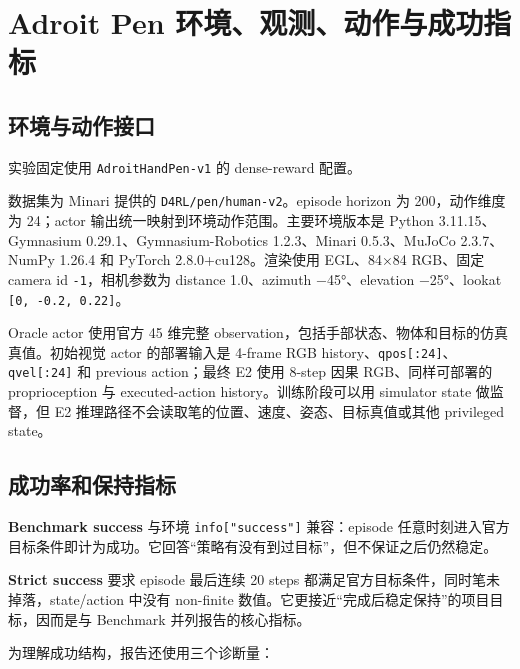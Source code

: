 \hypertarget{adroit-pen-ux73afux5883ux89c2ux6d4bux52a8ux4f5cux4e0eux6210ux529fux6307ux6807}{%
\section{Adroit Pen 环境、观测、动作与成功指标}\label{adroit-pen-ux73afux5883ux89c2ux6d4bux52a8ux4f5cux4e0eux6210ux529fux6307ux6807}}

\hypertarget{ux73afux5883ux4e0eux52a8ux4f5cux63a5ux53e3}{%
\subsection{环境与动作接口}\label{ux73afux5883ux4e0eux52a8ux4f5cux63a5ux53e3}}

实验固定使用 \texttt{AdroitHandPen-v1} 的 dense-reward 配置。\par 数据集为 Minari 提供的 \texttt{D4RL/pen/human-v2}。episode horizon 为 200，动作维度为 24；actor 输出统一映射到环境动作范围。主要环境版本是 Python 3.11.15、Gymnasium 0.29.1、Gymnasium-Robotics 1.2.3、Minari 0.5.3、MuJoCo 2.3.7、NumPy 1.26.4 和 PyTorch 2.8.0+cu128。渲染使用 EGL、84×84 RGB、固定 camera id \texttt{-1}，相机参数为 distance 1.0、azimuth −45°、elevation −25°、lookat \texttt{{[}0,\ -0.2,\ 0.22{]}}。

Oracle actor 使用官方 45 维完整 observation，包括手部状态、物体和目标的仿真真值。初始视觉 actor 的部署输入是 4-frame RGB history、\texttt{qpos{[}:24{]}}、\texttt{qvel{[}:24{]}} 和 previous action；最终 E2 使用 8-step 因果 RGB、同样可部署的 proprioception 与 executed-action history。训练阶段可以用 simulator state 做监督，但 E2 推理路径不会读取笔的位置、速度、姿态、目标真值或其他 privileged state。

\hypertarget{ux6210ux529fux7387ux548cux4fddux6301ux6307ux6807}{%
\subsection{成功率和保持指标}\label{ux6210ux529fux7387ux548cux4fddux6301ux6307ux6807}}

\textbf{Benchmark success} 与环境 \texttt{info{[}"success"{]}} 兼容：episode 任意时刻进入官方目标条件即计为成功。它回答``策略有没有到过目标''，但不保证之后仍然稳定。

\textbf{Strict success} 要求 episode 最后连续 20 steps 都满足官方目标条件，同时笔未掉落，state/action 中没有 non-finite 数值。它更接近``完成后稳定保持''的项目目标，因而是与 Benchmark 并列报告的核心指标。

为理解成功结构，报告还使用三个诊断量：

